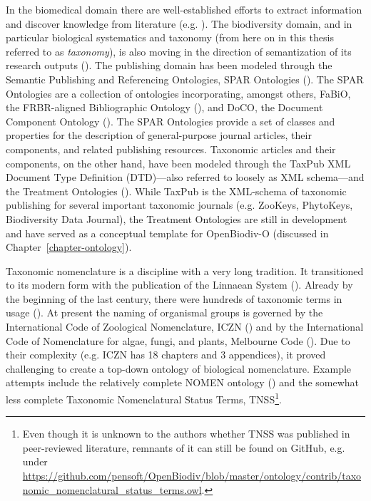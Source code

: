 In the biomedical domain there are well-established efforts to extract information and discover knowledge from literature (e.g. \cite{rebholz-schuhmann_facts_2005, momtchev_expanding_2009, williams_open_2012}).  The biodiversity domain, and in particular biological systematics and taxonomy (from here on in this thesis referred to as \emph{taxonomy}), is also moving in the direction of semantization of its research outputs (\cite{agosti_biodiversity_2006, patterson_taxonomic_2006,kennedy_scientific_2005,penev_fast_2010, tzitzikas_integrating_2013}).  The publishing domain has been modeled through the Semantic Publishing and Referencing Ontologies, SPAR Ontologies (\cite{peroni_semantic_2014}).   The SPAR Ontologies are a collection of ontologies incorporating, amongst others, FaBiO, the FRBR-aligned Bibliographic Ontology (\cite{peroni_fabio_2012}), and DoCO, the Document Component Ontology (\cite{constantin_document_2016}).   The SPAR Ontologies provide a set of classes and properties for the description of general-purpose journal articles, their components, and related publishing resources.  Taxonomic articles and their components, on the other hand, have been modeled through the TaxPub XML Document Type Definition (DTD)---also referred to loosely as XML schema---and the Treatment Ontologies (\cite{catapano_taxpub:_2010}).  While TaxPub is the XML-schema of taxonomic publishing for several important taxonomic journals (e.g. ZooKeys, PhytoKeys, Biodiversity Data Journal), the Treatment Ontologies are still in development and have served as a conceptual template for OpenBiodiv-O (discussed in Chapter~\ref{chapter-ontology}). 

Taxonomic nomenclature is a discipline with a very long tradition.  It transitioned to its modern form with the publication of the Linnaean System (\cite{linnaeus_systema_1758}).  Already by the beginning of the last century, there were hundreds of taxonomic terms in usage (\cite{witteveen_naming_2015}).  At present the naming of organismal groups is governed by the International Code of Zoological Nomenclature, ICZN (\cite{international_commission_on_zoological_nomenclature_international_1999}) and by the International Code of Nomenclature for algae, fungi, and plants, Melbourne Code (\cite{noauthor_international_2012}).  Due to their complexity (e.g. ICZN has 18 chapters and 3 appendices), it proved challenging to create a top-down ontology of biological nomenclature. Example attempts include the relatively complete NOMEN ontology (\cite{dmitriev_nomen_2017}) and the somewhat less complete Taxonomic Nomenclatural Status Terms, TNSS\footnote{Even though it is unknown to the authors whether TNSS was published in peer-reviewed literature, remnants of it can still be found on GitHub, e.g. under \url{https://github.com/pensoft/OpenBiodiv/blob/master/ontology/contrib/taxonomic_nomenclatural_status_terms.owl}.}.


